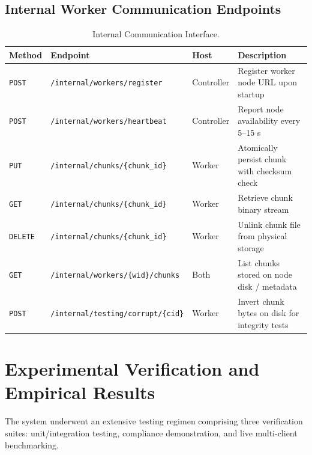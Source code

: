 \documentclass[11pt,a4paper]{article}
\begin{document}
\subsection{Internal Worker Communication Endpoints}
\begin{table}[H]
\centering
\small
\begin{tabular}{@{}llll@{}}
\toprule
\textbf{Method} & \textbf{Endpoint} & \textbf{Host} & \textbf{Description} \\ \midrule
\texttt{POST}   & \texttt{/internal/workers/register}       & Controller & Register worker node URL upon startup \\
\texttt{POST}   & \texttt{/internal/workers/heartbeat}      & Controller & Report node availability every 5--15 s \\
\texttt{PUT}    & \texttt{/internal/chunks/\{chunk\_id\}}   & Worker     & Atomically persist chunk with checksum check \\
\texttt{GET}    & \texttt{/internal/chunks/\{chunk\_id\}}   & Worker     & Retrieve chunk binary stream \\
\texttt{DELETE} & \texttt{/internal/chunks/\{chunk\_id\}}   & Worker     & Unlink chunk file from physical storage \\
\texttt{GET}    & \texttt{/internal/workers/\{wid\}/chunks} & Both       & List chunks stored on node disk / metadata \\
\texttt{POST}   & \texttt{/internal/testing/corrupt/\{cid\}} & Worker     & Invert chunk bytes on disk for integrity tests \\ \bottomrule
\end{tabular}
\caption{Internal Communication Interface.}
\label{tab:internal_api}
\end{table}

\section{Experimental Verification and Empirical Results}
\label{sec:eval}

The system underwent an extensive testing regimen comprising three verification suites: unit/integration testing, compliance demonstration, and live multi-client benchmarking.
\end{document}
